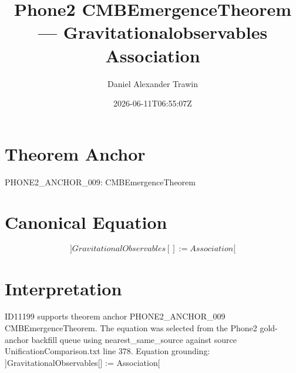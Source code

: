 \documentclass[11pt]{article}
\title{Phone2 CMBEmergenceTheorem — Gravitationalobservables Association}
\author{Daniel Alexander Trawin}
\date{2026-06-11T06:55:07Z}
\begin{document}
\maketitle
\section*{Theorem Anchor}
PHONE2_ANCHOR_009: CMBEmergenceTheorem
\section*{Canonical Equation}
\[
]GravitationalObservables[] := Association[
\]
\section*{Interpretation}
ID11199 supports theorem anchor PHONE2_ANCHOR_009 CMBEmergenceTheorem. The equation was selected from the Phone2 gold-anchor backfill queue using nearest_same_source against source UnificationComparison.txt line 378. Equation grounding: ]GravitationalObservables[] := Association[
\end{document}
